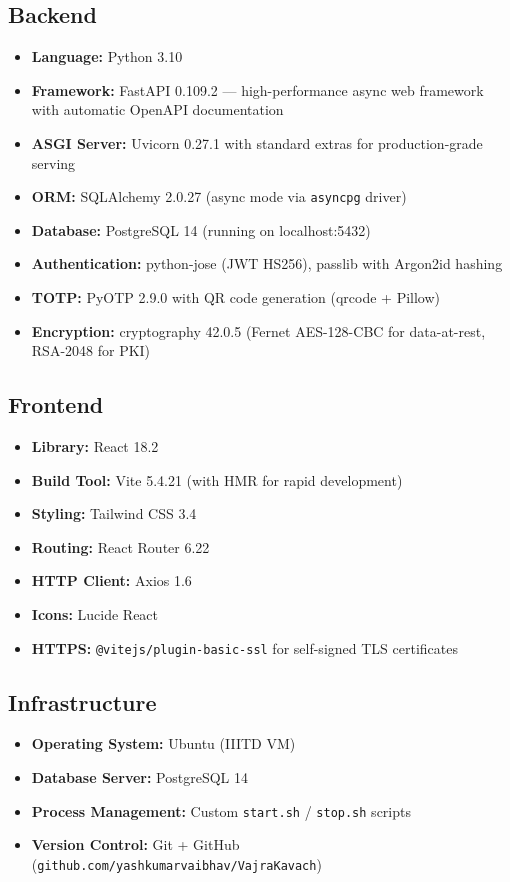 \documentclass[12pt,a4paper]{article}
\begin{document}
\subsection{Backend}
\begin{itemize}[leftmargin=1.5cm]
  \item \textbf{Language:} Python 3.10
  \item \textbf{Framework:} FastAPI 0.109.2 --- high-performance async web framework with automatic OpenAPI documentation
  \item \textbf{ASGI Server:} Uvicorn 0.27.1 with standard extras for production-grade serving
  \item \textbf{ORM:} SQLAlchemy 2.0.27 (async mode via \texttt{asyncpg} driver)
  \item \textbf{Database:} PostgreSQL 14 (running on localhost:5432)
  \item \textbf{Authentication:} python-jose (JWT HS256), passlib with Argon2id hashing
  \item \textbf{TOTP:} PyOTP 2.9.0 with QR code generation (qrcode + Pillow)
  \item \textbf{Encryption:} cryptography 42.0.5 (Fernet AES-128-CBC for data-at-rest, RSA-2048 for PKI)
\end{itemize}

\subsection{Frontend}
\begin{itemize}[leftmargin=1.5cm]
  \item \textbf{Library:} React 18.2
  \item \textbf{Build Tool:} Vite 5.4.21 (with HMR for rapid development)
  \item \textbf{Styling:} Tailwind CSS 3.4
  \item \textbf{Routing:} React Router 6.22
  \item \textbf{HTTP Client:} Axios 1.6
  \item \textbf{Icons:} Lucide React
  \item \textbf{HTTPS:} \texttt{@vitejs/plugin-basic-ssl} for self-signed TLS certificates
\end{itemize}

\subsection{Infrastructure}
\begin{itemize}[leftmargin=1.5cm]
  \item \textbf{Operating System:} Ubuntu (IIITD VM)
  \item \textbf{Database Server:} PostgreSQL 14
  \item \textbf{Process Management:} Custom \texttt{start.sh} / \texttt{stop.sh} scripts
  \item \textbf{Version Control:} Git + GitHub (\texttt{github.com/yashkumarvaibhav/VajraKavach})
\end{itemize}
\end{document}
